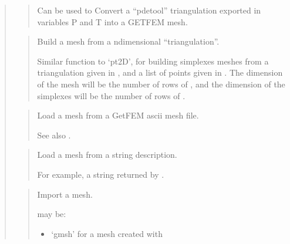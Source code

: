 \documentclass[a4paper,11pt,english]{sphinxmanual}
\begin{document}
\begin{quote}
\begin{quote}
\sphinxAtStartPar
Can be used to Convert a “pdetool” triangulation exported in
variables P and T into a GETFEM mesh.
\end{quote}

\sphinxAtStartPar
{}
\begin{quote}

\sphinxAtStartPar
Build a mesh from a n\sphinxhyphen{}dimensional “triangulation”.

\sphinxAtStartPar
Similar function to ‘pt2D’, for building simplexes meshes from a
triangulation given in , and a list of points given in . The
dimension of the mesh will be the number of rows of , and the
dimension of the simplexes will be the number of rows of .
\end{quote}

\sphinxAtStartPar
{}
\begin{quote}

\sphinxAtStartPar
Load a mesh from a GetFEM ascii mesh file.

\sphinxAtStartPar
See also .
\end{quote}

\sphinxAtStartPar
{}
\begin{quote}

\sphinxAtStartPar
Load a mesh from a string description.

\sphinxAtStartPar
For example, a string returned by .
\end{quote}

\sphinxAtStartPar
{}
\begin{quote}

\sphinxAtStartPar
Import a mesh.

\sphinxAtStartPar
{} may be:
\begin{itemize}
\item {} 
\sphinxAtStartPar
‘gmsh’ for a mesh created with 


\end{itemize}
\end{quote}
\end{quote}
\end{document}
